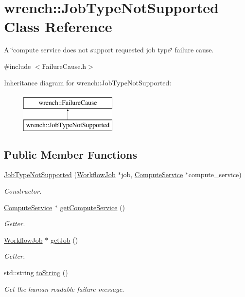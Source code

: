 \hypertarget{classwrench_1_1_job_type_not_supported}{}\section{wrench\+:\+:Job\+Type\+Not\+Supported Class Reference}
\label{classwrench_1_1_job_type_not_supported}


A \char`\"{}compute service does not support requested job type\char`\"{} failure cause.  




{\ttfamily \#include $<$Failure\+Cause.\+h$>$}

Inheritance diagram for wrench\+:\+:Job\+Type\+Not\+Supported\+:\begin{figure}[H]
\begin{center}
\leavevmode
\includegraphics[height=2.000000cm]{classwrench_1_1_job_type_not_supported}
\end{center}
\end{figure}
\subsection*{Public Member Functions}
\begin{DoxyCompactItemize}
\item 
\hyperlink{classwrench_1_1_job_type_not_supported_a778c9a1bf5fb19b3e380fa9e8c6a4120}{Job\+Type\+Not\+Supported} (\hyperlink{classwrench_1_1_workflow_job}{Workflow\+Job} $\ast$job, \hyperlink{classwrench_1_1_compute_service}{Compute\+Service} $\ast$compute\+\_\+service)
\begin{DoxyCompactList}\small\item\em Constructor. \end{DoxyCompactList}\item 
\hyperlink{classwrench_1_1_compute_service}{Compute\+Service} $\ast$ \hyperlink{classwrench_1_1_job_type_not_supported_af2875bcec00418cd655609f1b4f12e55}{get\+Compute\+Service} ()
\begin{DoxyCompactList}\small\item\em Getter. \end{DoxyCompactList}\item 
\hyperlink{classwrench_1_1_workflow_job}{Workflow\+Job} $\ast$ \hyperlink{classwrench_1_1_job_type_not_supported_ade89cf1d1f2a676f5d552b909ef30e5e}{get\+Job} ()
\begin{DoxyCompactList}\small\item\em Getter. \end{DoxyCompactList}\item 
std\+::string \hyperlink{classwrench_1_1_job_type_not_supported_ab6a302367f2db332484da0c256e3ae5c}{to\+String} ()
\begin{DoxyCompactList}\small\item\em Get the human-\/readable failure message. \end{DoxyCompactList}\end{DoxyCompactItemize}
